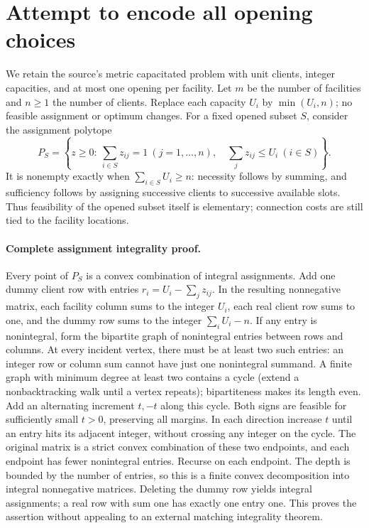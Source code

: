 \documentclass[11pt]{article}
\begin{document}
\section{Attempt to encode all opening choices}
We retain the source's metric capacitated problem with unit clients, integer
capacities, and at most one opening per facility. Let $m$ be the number of
facilities and $n\ge1$ the number of clients. Replace each capacity $U_i$ by
$\min(U_i,n)$; no feasible assignment or optimum changes.
For a fixed opened subset $S$, consider the assignment polytope
\[
P_S=\left\{z\ge0:\ \sum_{i\in S}z_{ij}=1\ (j=1,\ldots,n),\quad
\sum_j z_{ij}\le U_i\ (i\in S)\right\}.
\]
It is nonempty exactly when $\sum_{i\in S}U_i\ge n$: necessity follows by
summing, and sufficiency follows by assigning successive clients to successive
available slots. Thus feasibility of the opened subset itself is elementary;
connection costs are still tied to the facility locations.

\paragraph{Complete assignment integrality proof.}
Every point of $P_S$ is a convex combination of integral assignments.
Add one dummy client row with entries
$r_i=U_i-\sum_j z_{ij}$. In the resulting nonnegative matrix, each facility
column sums to the integer $U_i$, each real client row sums to one, and the
dummy row sums to the integer $\sum_iU_i-n$.
If any entry is nonintegral, form the bipartite graph of nonintegral entries
between rows and columns. At every incident vertex, there must be at least
two such entries: an integer row or column sum cannot have just one
nonintegral summand. A finite graph with minimum degree at least two contains
a cycle (extend a nonbacktracking walk until a vertex repeats); bipartiteness
makes its length even. Add an alternating increment $t,-t$ along this cycle.
Both signs are feasible for sufficiently small $t>0$, preserving all margins.
In each direction increase $t$ until an entry hits its adjacent integer,
without crossing any integer on the cycle. The original matrix is a strict
convex combination of these two endpoints, and each endpoint has fewer
nonintegral entries. Recurse on each endpoint. The depth is bounded by the
number of entries, so this is a finite convex decomposition into integral
nonnegative matrices. Deleting the dummy row yields integral assignments;
a real row with sum one has exactly one entry one. This proves the assertion
without appealing to an external matching integrality theorem.
\end{document}
